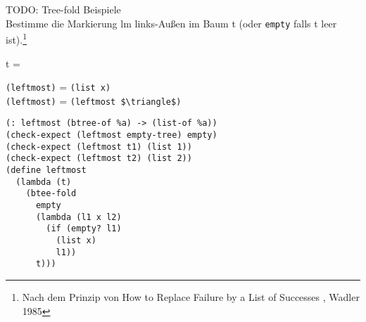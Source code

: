 TODO: Tree-fold Beispiele\\
Bestimme die Markierung lm links-Au\ss en im Baum t (oder \lstinline|empty| falls t leer ist).\footnote{Nach dem Prinzip von \glqq How to Replace Failure by a List of Successes \grqq, Wadler 1985}
\begin{minipage}[c]{0.25\textwidth}
t = 
\end{minipage}%
\begin{minipage}[c]{0.75\textwidth}
\lstinline|(leftmost|\lstinline|)| = \lstinline|(list x)|\\
\lstinline|(leftmost|\lstinline|)| = \lstinline[mathescape]|(leftmost $\triangle$)|
\end{minipage}
\begin{lstlisting}
(: leftmost (btree-of %a) -> (list-of %a))
(check-expect (leftmost empty-tree) empty)
(check-expect (leftmost t1) (list 1))
(check-expect (leftmost t2) (list 2))
(define leftmost
  (lambda (t)
    (btee-fold
      empty
      (lambda (l1 x l2)
        (if (empty? l1)
          (list x)
          l1))
      t)))
\end{lstlisting}
